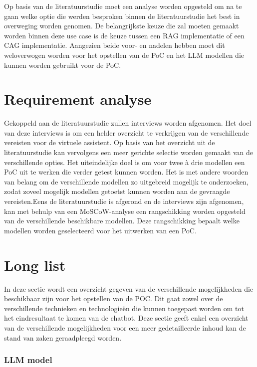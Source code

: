 Op basis van de literatuurstudie moet een analyse worden opgesteld om na te gaan welke optie die werden besproken binnen de literatuurstudie het best in overweging worden genomen. De belangrijkste keuze die zal moeten gemaakt worden binnen deze use case is de keuze tussen een RAG implementatie of een CAG implementatie. Aangezien beide voor- en nadelen hebben moet dit weloverwogen worden voor het opstellen van de PoC en het LLM modellen die kunnen worden gebruikt voor de PoC.


\section{Requirement analyse}


Gekoppeld aan de literatuurstudie zullen interviews worden afgenomen. Het doel van deze interviews is om een helder overzicht te verkrijgen van de verschillende vereisten voor de virtuele assistent. Op basis van het overzicht uit de literatuurstudie kan vervolgens een meer gerichte selectie worden gemaakt van de verschillende opties. Het uiteindelijke doel is om voor twee à drie modellen een PoC uit te werken die verder getest kunnen worden. Het is met andere woorden van belang om de verschillende modellen zo uitgebreid mogelijk te onderzoeken, zodat zoveel mogelijk modellen getoetst kunnen worden aan de gevraagde vereisten.Eens de literatuurstudie is afgerond en de interviews zijn afgenomen, kan met behulp van een MoSCoW-analyse een rangschikking worden opgesteld van de verschillende beschikbare modellen. Deze rangschikking bepaalt welke modellen worden geselecteerd voor het uitwerken van een PoC.

\section{Long list}

In deze sectie wordt een overzicht gegeven van de verschillende mogelijkheden die beschikbaar zijn voor het opstellen van de POC. Dit gaat zowel over de verschillende technieken en technologieën die kunnen toegepast worden om tot het eindresultaat te komen van de chatbot. Deze sectie geeft enkel een overzicht van de verschillende mogelijkheden voor een meer gedetailleerde inhoud kan de stand van zaken geraadpleegd worden.

\subsubsection{LLM model}

